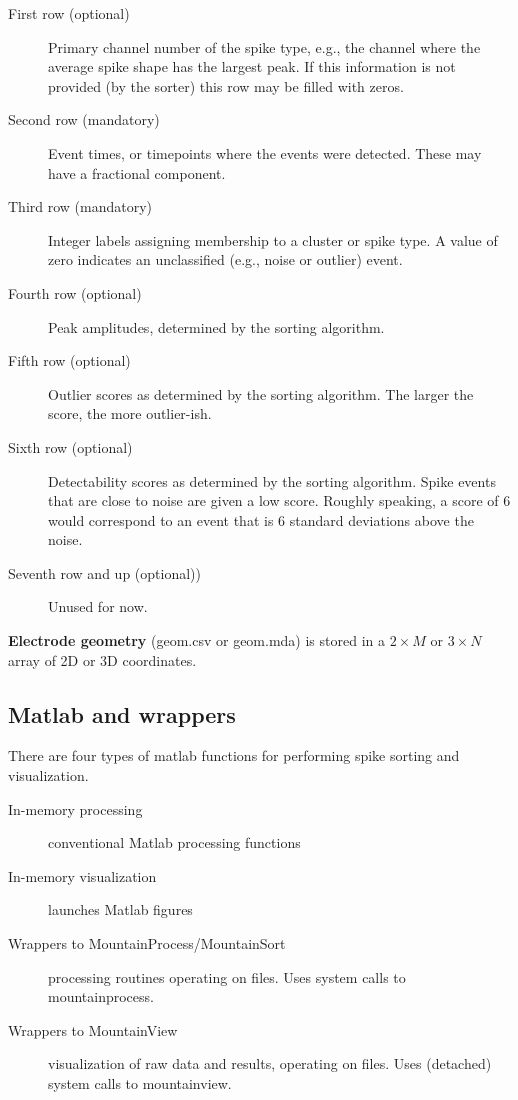 \documentclass{article}
\begin{document}
\begin{description}
\item[First row (optional)] Primary channel number of the spike type, e.g., the channel where the average spike shape has the largest peak. If this information is not provided (by the sorter) this row may be filled with zeros.
\item[Second row (mandatory)] Event times, or timepoints where the events were detected. These may have a fractional component.
\item[Third row (mandatory)] Integer labels assigning membership to a cluster or spike type. A value of zero indicates an unclassified (e.g., noise or outlier) event.
\item[Fourth row (optional)] Peak amplitudes, determined by the sorting algorithm.
\item[Fifth row (optional)] Outlier scores as determined by the sorting algorithm. The larger the score, the more outlier-ish.
\item[Sixth row (optional)] Detectability scores as determined by the sorting algorithm. Spike events that are close to noise are given a low score. Roughly speaking, a score of $6$ would correspond to an event that is $6$ standard deviations above the noise.
\item[Seventh row and up (optional))] Unused for now.
\end{description}

\textbf{Electrode geometry} (geom.csv or geom.mda) is stored in a $2\times M$ or $3\times N$ array of 2D or 3D coordinates.

\subsection{Matlab and wrappers}

There are four types of matlab functions for performing spike sorting and visualization.

\begin{description}
\item[In-memory processing] conventional Matlab processing functions
\item[In-memory visualization] launches Matlab figures
\item[Wrappers to MountainProcess/MountainSort] processing routines 
operating on files. Uses system calls to mountainprocess.
\item[Wrappers to MountainView] visualization of raw data and results, operating on files. Uses (detached) system calls to mountainview.
\end{description}
\end{document}
